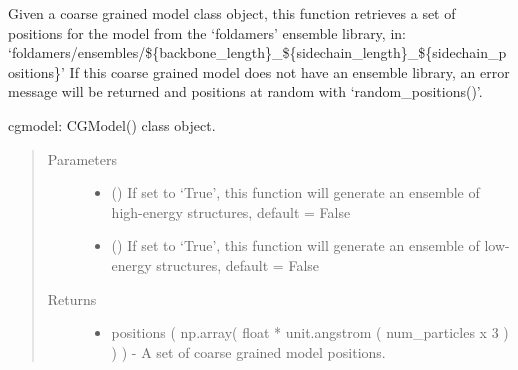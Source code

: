 \documentclass[letterpaper,12pt,english,openany,oneside]{sphinxmanual}
\begin{document}

\begin{fulllineitems}
\label{\detokenize{utilities:utilities.util.get_structure_from_library}}
Given a coarse grained model class object, this function retrieves
a set of positions for the model from the ‘foldamers’ ensemble library, in:
‘foldamers/ensembles/\$\{backbone\_length\}\_\$\{sidechain\_length\}\_\$\{sidechain\_positions\}’
If this coarse grained model does not have an ensemble library, an 
error message will be returned and positions at random with ‘random\_positions()’.

cgmodel: CGModel() class object.
\begin{quote}\begin{description}
\item[{Parameters}] \leavevmode\begin{itemize}
\item {} 
 () \textendash{} If set to ‘True’, this function will generate an ensemble of high-energy structures, default = False

\item {} 
 () \textendash{} If set to ‘True’, this function will generate an ensemble of low-energy structures, default = False

\end{itemize}

\item[{Returns}] \leavevmode
\begin{itemize}
\item {} 
positions ( np.array( float * unit.angstrom ( num\_particles x 3 ) ) ) - A set of coarse grained model positions.

\end{itemize}


\end{description}\end{quote}

\end{fulllineitems}
\end{document}
